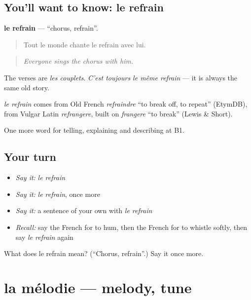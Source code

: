 \subsection*{You'll want to know: le refrain}
\textbf{le refrain} — \textquotedblleft{}chorus, refrain\textquotedblright{}.

\begin{quote}
Tout le monde chante le refrain avec lui.
\end{quote}

\begin{quote}
\emph{Everyone sings the chorus with him.}
\end{quote}

The verses are \emph{les couplets}. \emph{C'est toujours le même refrain} — it is always the same old story.

\begin{cousinweb}
\emph{le refrain} comes from Old French \emph{refraindre} \textquotedblleft{}to break off, to repeat\textquotedblright{} (EtymDB), from Vulgar Latin \emph{refrangere}, built on \emph{frangere} \textquotedblleft{}to break\textquotedblright{} (Lewis \& Short).
\end{cousinweb}

\begin{grammarlens}[title={What you've built}]
One more word for telling, explaining and describing at B1.
\end{grammarlens}

\subsection*{Your turn}
\begin{itemize}
\raggedright
  \item \emph{Say it:} \emph{le refrain}
  \item \emph{Say it:} \emph{le refrain}, once more
  \item \emph{Say it:} a sentence of your own with \emph{le refrain}
  \item \emph{Recall:} say the French for to hum, then the French for to whistle softly, then say \emph{le refrain} again
\end{itemize}

\begin{tcolorbox}[breakable,colback=teal!4,colframe=teal!35!black,title={Before you move on}]
What does le refrain mean? (\textquotedblleft{}Chorus, refrain\textquotedblright{}.) Say it once more.
\end{tcolorbox}
\section[la mélodie]{la mélodie — melody, tune}

